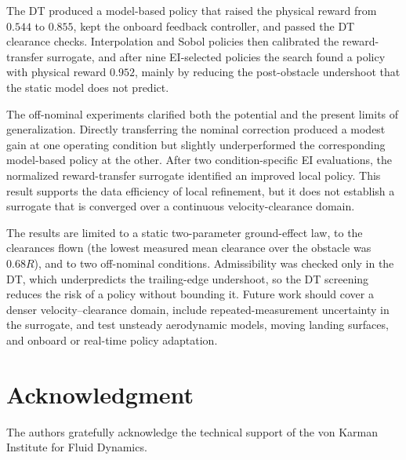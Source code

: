 \documentclass[journal]{IEEEtran}
\begin{document}
The DT produced a model-based policy that raised the physical reward from $0.544$ to $0.855$, kept the onboard feedback controller, and passed the DT clearance checks. Interpolation and Sobol policies then calibrated the reward-transfer surrogate, and after nine EI-selected policies the search found a policy with physical reward $0.952$, mainly by reducing the post-obstacle undershoot that the static model does not predict.

The off-nominal experiments clarified both the potential and the present limits of generalization. Directly transferring the nominal correction produced a modest gain at one operating condition but slightly underperformed the corresponding model-based policy at the other. After two condition-specific EI evaluations, the normalized reward-transfer surrogate identified an improved local policy. This result supports the data efficiency of local refinement, but it does not establish a surrogate that is converged over a continuous velocity-clearance domain.

The results are limited to a static two-parameter ground-effect law, to the clearances flown (the lowest measured mean clearance over the obstacle was $0.68R$), and to two off-nominal conditions. Admissibility was checked only in the DT, which underpredicts the trailing-edge undershoot, so the DT screening reduces the risk of a policy without bounding it. Future work should cover a denser velocity--clearance domain, include repeated-measurement uncertainty in the surrogate, and test unsteady aerodynamic models, moving landing surfaces, and onboard or real-time policy adaptation.

\section*{Acknowledgment}
The authors gratefully acknowledge the technical support of the von Karman Institute for Fluid Dynamics.



\end{document}

